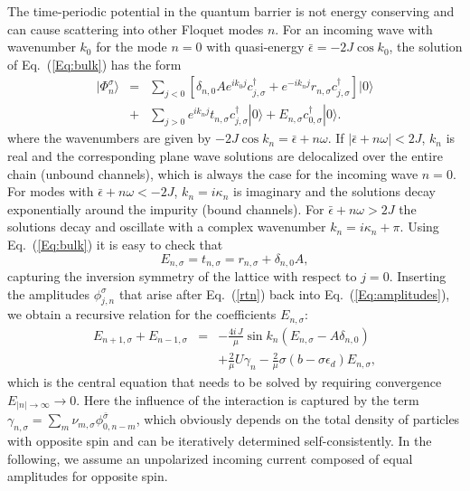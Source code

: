 \documentclass[aps,twocolumn,showpacs,floatfix,prl]{revtex4}
\newcommand{\be}{\begin{equation}}
\newcommand{\ee}{\end{equation}}
\newcommand{\bea}{\begin{eqnarray}}
\newcommand{\eea}{\end{eqnarray}}
\begin{document}
The time-periodic potential in the quantum barrier is not energy conserving and 
can cause scattering into other Floquet modes $n$.  For an incoming wave with 
 wavenumber $k_0$ for the mode
$n=0$ with quasi-energy $\bar{\epsilon} = -2J\cos k_0$,
the solution of 
Eq.~(\ref{Eq:bulk}) has the form
\bea 
|\Phi_n^\sigma\rangle &=& \sum_{j<0} \left[\delta_{n,0} A e^{i k_0 j} c_{j,\sigma}^\dagger + e^{-i k_n j} r_{n, \sigma} c_{j, \sigma}^\dagger \right] | 0 \rangle \nonumber \\  
&+& \sum_{j>0}e^{i k_n j} t_{n, \sigma}  c_{j, \sigma}^\dagger | 0 \rangle
+ E_{n,\sigma} c^{\dagger}_{0,\sigma} | 0 \rangle .
\eea
where the wavenumbers are given by $-2J\cos k_n = \bar{\epsilon} + n\omega$.
If $|\bar{\epsilon}+n\omega|<2J$, $k_n$ is real 
and the corresponding plane wave solutions are delocalized over 
the entire chain (unbound channels), which is always the case for the incoming wave $n=0$. 
For modes with $\bar{\epsilon}+ n\omega<-2J$, $k_n=i\kappa_n$ is imaginary and the solutions decay exponentially around the impurity (bound channels).
For $\bar{\epsilon}+ n\omega>2J$ the solutions decay and oscillate with a complex wavenumber $k_n=i\kappa_n+\pi$.
Using Eq.~(\ref{Eq:bulk}) it is easy to check that
\be
E_{n, \sigma}=t_{n, \sigma}=r_{n, \sigma}+\delta_{n,0} A, \label{rtn}
\ee
capturing the inversion symmetry of the lattice with respect to $j=0$.  
Inserting the amplitudes $\phi_{j,n}^{\sigma}$ that arise after Eq.~(\ref{rtn}) back into Eq.~(\ref{Eq:amplitudes}), we obtain a recursive relation for the coefficients $E_{n, \sigma}$:
\bea 
E_{n+1,\sigma} + E_{n-1,\sigma} &=& -  \frac{4 i\,J}{\mu} \sin k_n (E_{n,\sigma} - A \delta_{n,0})\nonumber\\
&& + \frac{2}{\mu} U \gamma_n
- \frac{2}{\mu}\sigma (b - {\sigma}\epsilon_d)E_{n,\sigma}, \label{Eq:recurrence}
\eea
which is the central equation that needs to be solved by requiring
convergence $E_{|n|\to \infty} \to 0$.  Here 
the influence of the interaction is captured by 
the term $\gamma_{n, \sigma} = \sum_m \nu_{m,\sigma} \phi^{\bar{\sigma}}_{0,n-m}$, 
which obviously depends on the total density of particles with opposite spin and can
be iteratively determined self-consistently.
In the following, we assume 
an unpolarized incoming current 
composed of equal amplitudes for opposite spin.
\end{document}
